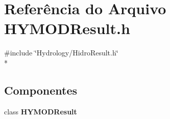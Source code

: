 \section{Referência do Arquivo H\+Y\+M\+O\+D\+Result.\+h}
\label{_h_y_m_o_d_result_8h}
{\ttfamily \#include \char`\"{}Hydrology/\+Hidro\+Result.\+h\char`\"{}}\\*
\subsection*{Componentes}
\begin{DoxyCompactItemize}
\item 
class {\bf H\+Y\+M\+O\+D\+Result}
\end{DoxyCompactItemize}
